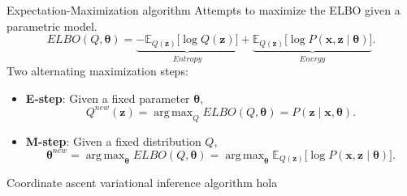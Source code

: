 \documentclass{beamer}
\newcommand{\bx}{\bm{x}}
\newcommand{\bz}{\bm{z}}
\newcommand{\btheta}{\bm{\theta}}
\DeclareMathOperator*{\argmax}{arg\,max}
\newcommand\E[2]{\mathbb{E}_{#1}\Big[#2\Big]}
\begin{document}
  \begin{frame}{Expectation-Maximization algorithm}
    Attempts to maximize the ELBO given a parametric model.
    \[
      ELBO(Q, \btheta) = \underbrace{- \E{Q(\bz)}{\log Q(\bz)}}_{Entropy} + \underbrace{\E{Q(\bz)}{\log P(\bx, \bz \mid \btheta)}}_{Energy}.
    \]
    Two alternating maximization steps:
    \begin{itemize}
      \item \textbf{E-step}: Given a fixed parameter \(\btheta\),
        \[
        Q^{new}(\bz) = \argmax_{Q} ELBO(Q, \btheta) = P(\bz \mid \bx, \btheta).
        \]
      \item \textbf{M-step}: Given a fixed distribution \(Q\),
        \[
        \btheta^{new} = \argmax_{\btheta} ELBO(Q, \btheta) = \argmax_{\btheta} \E{Q(\bz)}{\log P(\bx, \bz \mid \btheta)}.
        \]
    \end{itemize}
  \end{frame}

  \begin{frame}{Coordinate ascent variational inference algorithm}
    hola
  \end{frame}
\end{document}
